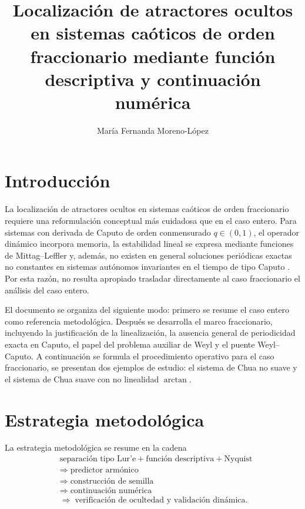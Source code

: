 \documentclass[journal]{IEEEtran}
\begin{document}
\title{Localización de atractores ocultos en sistemas caóticos de orden fraccionario mediante función descriptiva y continuación numérica}
\author{María Fernanda Moreno-López}%


\maketitle



\newpage

\section{Introducción}
La localización de atractores ocultos en sistemas caóticos de orden fraccionario requiere una reformulación conceptual más cuidadosa que en el caso entero. Para sistemas con derivada de Caputo de orden conmensurado \(q\in(0,1)\), el operador dinámico incorpora memoria, la estabilidad lineal se expresa mediante funciones de Mittag--Leffler y, además, no existen en general soluciones periódicas exactas no constantes en sistemas autónomos invariantes en el tiempo de tipo Caputo \cite{TavazoeiHaeri2009,AreaLosadaNieto2014}. Por esta razón, no resulta apropiado trasladar directamente al caso fraccionario el análisis del caso entero. 

El documento se organiza del siguiente modo: primero se resume el caso entero como referencia metodológica. Después se desarrolla el marco fraccionario, incluyendo la justificación de la linealización, la ausencia general de periodicidad exacta en Caputo, el papel del problema auxiliar de Weyl y el puente Weyl--Caputo. A continuación se formula el procedimiento operativo para el caso fraccionario, se presentan dos ejemplos de estudio: el sistema de Chua no suave y el sistema de Chua suave con no linealidad \(\arctan\).

\section{Estrategia metodológica}
La estrategia metodológica se resume en la cadena
\[
\begin{aligned}
&\text{separación tipo Lur'e} + \text{función descriptiva} + \text{Nyquist}\\
&\Longrightarrow\; \text{predictor armónico}\\
&\Longrightarrow\; \text{construcción de semilla}\\
&\Longrightarrow\; \text{continuación numérica}\\
&\Longrightarrow\; \text{verificación de ocultedad y validación dinámica}.
\end{aligned}
\]
\end{document}
